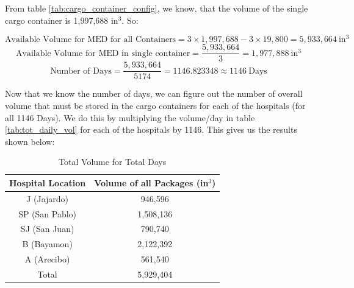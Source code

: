 From table \ref{tab:cargo_container_config}, we know, that the volume of the single cargo container is 1,997,688 in$^3$. So: 

\begin{equation}
    \text{Available Volume for MED for all Containers} = 3 \times 1,997,688 - 3 \times 19,800 = 5,933,664 \: \text{in$^3$}
    \label{eq:avail_vol_all}
\end{equation}
\begin{equation}
    \text{Available Volume for MED in single container} = \frac{5,933,664}{3} = 1,977,888 \: \text{in$^3$}
    \label{eq:avail_vol}
\end{equation}
\begin{equation}
    \text{Number of Days} = \frac{5,933,664}{5174} = 1146.823348 \approx 1146 \: \text{Days}
    \label{eq:B_vol}
\end{equation}

Now that we know the number of days, we can figure out the number of overall volume that must be stored in the cargo containers for each of the hospitals (for all 1146 Days). We do this by multiplying the volume/day in table \ref{tab:tot_daily_vol} for each of the hospitals by 1146. This gives us the results shown below:

\begin{table}[h]
    \centering
    \begin{tabular}{c|c}
    \hline Hospital Location & Volume of all Packages (in$^3$) \\
    \hline
    J (Jajardo) & 946,596\\
    SP (San Pablo) & 1,508,136\\
    SJ (San Juan) & 790,740\\
    B (Bayamon) & 2,122,392\\
    A (Arecibo) & 561,540\\
    \hline
    Total & 5,929,404\\
    \hline
    \end{tabular}
    \caption{Total Volume for Total Days}
    \label{tab:tot_vol}
\end{table}

